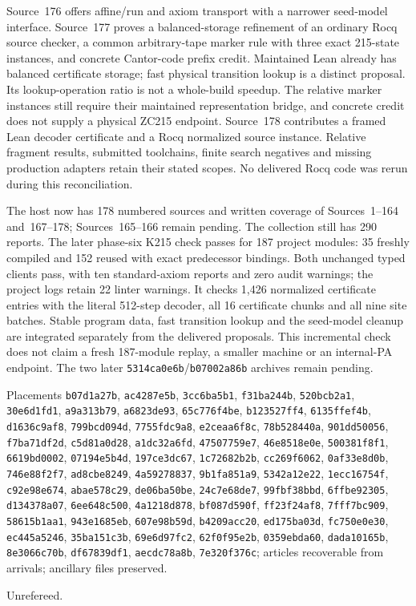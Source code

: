 \documentclass[11pt]{article}
\begin{document}
{Source~176 offers affine/run and axiom transport with a narrower seed-model
interface. Source~177 proves a balanced-storage refinement of an ordinary
Rocq source checker, a common arbitrary-tape marker rule with three exact
215-state instances, and concrete Cantor-code prefix credit. Maintained Lean
already has balanced certificate storage; fast physical transition lookup is
a distinct proposal. Its lookup-operation ratio is not a whole-build speedup.
The relative marker instances still require their maintained representation
bridge, and concrete credit does not supply a physical ZC215 endpoint.
Source~178 contributes a framed Lean decoder certificate and a Rocq normalized
source instance. Relative fragment results, submitted toolchains, finite
search negatives and missing production adapters retain their stated scopes.
No delivered Rocq code was rerun during this reconciliation.

The host now has 178 numbered sources and written coverage of Sources~1--164
and~167--178; Sources~165--166 remain pending. The collection still has
290 reports. The later phase-six K215 check passes for 187 project modules:
35 freshly compiled and 152 reused with exact predecessor bindings.
Both unchanged typed clients pass, with ten standard-axiom reports and zero
audit warnings; the project logs retain 22 linter warnings. It checks
1,426 normalized certificate entries with the literal 512-step decoder,
all 16 certificate chunks and all nine site batches. Stable program data,
fast transition lookup and the seed-model cleanup are integrated separately
from the delivered proposals. This incremental check does not claim a fresh
187-module replay, a smaller machine or an internal-PA endpoint. The two later
\texttt{5314ca0e6b}/\texttt{b07002a86b} archives remain pending.

{\raggedright\footnotesize Placements \texttt{b07d1a27b}, \texttt{ac4287e5b}, \texttt{3cc6ba5b1}, \texttt{f31ba244b}, \texttt{520bcb2a1}, \texttt{30e6d1fd1}, \texttt{a9a313b79}, \texttt{a6823de93}, \texttt{65c776f4be}, \texttt{b123527ff4}, \texttt{6135ffef4b}, \texttt{d1636c9af8}, \texttt{799bcd094d}, \texttt{7755fdc9a8}, \texttt{e2ceaa6f8c}, \texttt{78b528440a}, \texttt{901dd50056}, \texttt{f7ba71df2d}, \texttt{c5d81a0d28}, \texttt{a1dc32a6fd}, \texttt{47507759e7}, \texttt{46e8518e0e}, \texttt{500381f8f1}, \texttt{6619bd0002}, \texttt{07194e5b4d}, \texttt{197ce3dc67}, \texttt{1c72682b2b}, \texttt{cc269f6062}, \texttt{0af33e8d0b}, \texttt{746e88f2f7}, \texttt{ad8cbe8249}, \texttt{4a59278837}, \texttt{9b1fa851a9}, \texttt{5342a12e22}, \texttt{1ecc16754f}, \texttt{c92e98e674}, \texttt{abae578c29}, \texttt{de06ba50be}, \texttt{24c7e68de7}, \texttt{99fbf38bbd}, \texttt{6ffbe92305}, \texttt{d134378a07}, \texttt{6ee648c500}, \texttt{4a1218d878}, \texttt{bf087d590f}, \texttt{ff23f24af8}, \texttt{7fff7bc909}, \texttt{58615b1aa1}, \texttt{943e1685eb}, \texttt{607e98b59d}, \texttt{b4209acc20}, \texttt{ed175ba03d}, \texttt{fc750e0e30}, \texttt{ec445a5246}, \texttt{35ba151c3b}, \texttt{69e6d97fc2}, \texttt{62f0f95e2b}, \texttt{0359ebda60}, \texttt{dada10165b}, \texttt{8e3066c70b}, \texttt{df67839df1}, \texttt{aecdc78a8b}, \texttt{7e320f376c};
articles recoverable from arrivals; ancillary files preserved.\par}
Unrefereed.}
\end{document}
